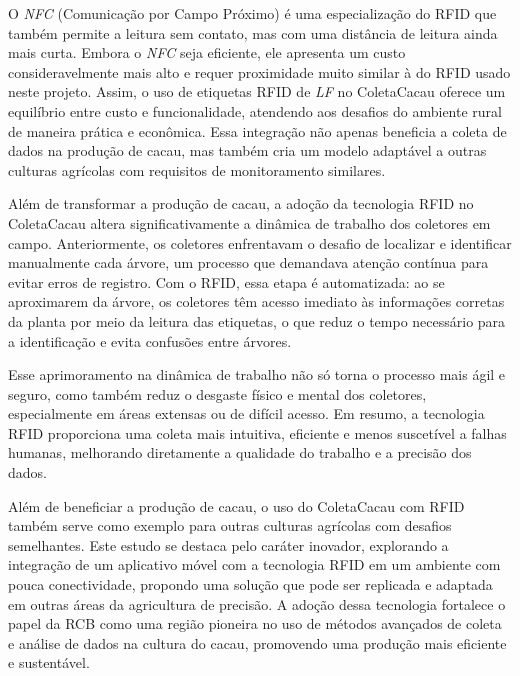 O \textit{NFC} (Comunicação por Campo Próximo) é uma especialização do RFID que também permite a leitura sem contato, mas com uma distância de leitura ainda mais curta. Embora o \textit{NFC} seja eficiente, ele apresenta um custo consideravelmente mais alto e requer proximidade muito similar à do RFID usado neste projeto. Assim, o uso de etiquetas RFID de \textit{LF} no ColetaCacau oferece um equilíbrio entre custo e funcionalidade, atendendo aos desafios do ambiente rural de maneira prática e econômica. Essa integração não apenas beneficia a coleta de dados na produção de cacau, mas também cria um modelo adaptável a outras culturas agrícolas com requisitos de monitoramento similares.

Além de transformar a produção de cacau, a adoção da tecnologia RFID no ColetaCacau altera significativamente a dinâmica de trabalho dos coletores em campo. Anteriormente, os coletores enfrentavam o desafio de localizar e identificar manualmente cada árvore, um processo que demandava atenção contínua para evitar erros de registro. Com o RFID, essa etapa é automatizada: ao se aproximarem da árvore, os coletores têm acesso imediato às informações corretas da planta por meio da leitura das etiquetas, o que reduz o tempo necessário para a identificação e evita confusões entre árvores.

Esse aprimoramento na dinâmica de trabalho não só torna o processo mais ágil e seguro, como também reduz o desgaste físico e mental dos coletores, especialmente em áreas extensas ou de difícil acesso. Em resumo, a tecnologia RFID proporciona uma coleta mais intuitiva, eficiente e menos suscetível a falhas humanas, melhorando diretamente a qualidade do trabalho e a precisão dos dados.

Além de beneficiar a produção de cacau, o uso do ColetaCacau com RFID também serve como exemplo para outras culturas agrícolas com desafios semelhantes. Este estudo se destaca pelo caráter inovador, explorando a integração de um aplicativo móvel com a tecnologia RFID em um ambiente com pouca conectividade, propondo uma solução que pode ser replicada e adaptada em outras áreas da agricultura de precisão. A adoção dessa tecnologia fortalece o papel da RCB como uma região pioneira no uso de métodos avançados de coleta e análise de dados na cultura do cacau, promovendo uma produção mais eficiente e sustentável.

